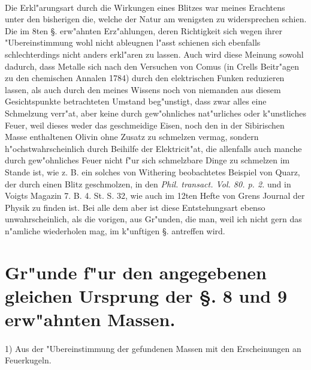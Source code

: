\documentclass[a4paper, 11pt, oneside, polutonikogreek, german]{article}
\begin{document}
\paragraph{}
Die Erkl"arungsart durch die Wirkungen eines Blitzes war meines Erachtens unter den bisherigen die, welche der Natur am wenigsten zu widersprechen schien. Die im 8ten §. erw"ahnten Erz"ahlungen, deren Richtigkeit sich wegen ihrer "Ubereinstimmung wohl nicht ableugnen l"asst schienen sich ebenfalls schlechterdings nicht anders erkl"aren zu lassen. Auch wird diese Meinung sowohl dadurch, dass Metalle sich nach den Versuchen von Comus (in Crells Beitr"agen zu den chemischen Annalen 1784) durch den elektrischen Funken reduzieren lassen, als auch durch den meines Wissens noch von niemanden aus diesem Gesichtspunkte betrachteten Umstand beg"unstigt, dass zwar alles eine Schmelzung verr"at, aber keine durch gew"ohnliches nat"urliches oder k"unstliches Feuer, weil dieses weder das geschmeidige Eisen, noch den in der Sibirischen Masse enthaltenen Olivin ohne Zusatz zu schmelzen vermag, sondern h"ochstwahrscheinlich durch Beihilfe der Elektricit"at, die allenfalls auch manche durch gew"ohnliches Feuer nicht f"ur sich schmelzbare Dinge zu schmelzen im Stande ist, wie z. B. ein solches von Withering beobachtetes Beispiel von Quarz, der durch einen Blitz geschmolzen, in den \emph{Phil. transact. Vol. 80. p. 2.} und in Voigts Magazin 7. B. 4. St. S. 32, wie auch im 12ten Hefte von Grens Journal der Physik zu finden ist. Bei alle dem aber ist diese Entstehungsart ebenso unwahrscheinlich, als die vorigen, aus Gr"unden, die man, weil ich nicht gern das n"amliche wiederholen mag, im k"unftigen §. antreffen wird.
\clearpage
\section{Gr"unde f"ur den angegebenen gleichen Ursprung der §. 8 und 9 erw"ahnten Massen.}
\paragraph{}
1) Aus der "Ubereinstimmung der gefundenen Massen mit den Erscheinungen an Feuerkugeln.
\end{document}
